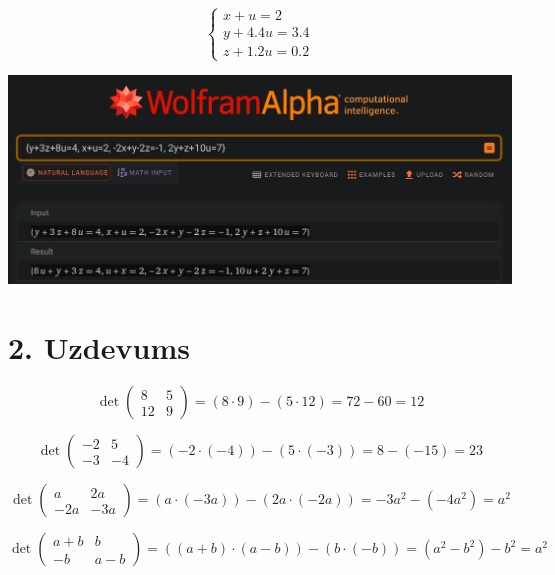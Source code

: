 \documentclass{article}
\begin{document}
\begin{equation*}
    \begin{cases}
        x + u = 2\\
        y + 4.4u = 3.4\\
        z + 1.2u = 0.2
    \end{cases}
\end{equation*}

\includegraphics[width=\textwidth]{1}

\section*{2. Uzdevums}
\begin{equation*}
\det
\begin{pmatrix}
    8 & 5\\
    12 & 9
\end{pmatrix} 
 =
(8 \cdot 9) - (5 \cdot 12)
= 
72 - 60
=
12
\end{equation*}

\begin{equation*}
    \det
    \begin{pmatrix}
        -2 & 5\\
        -3 & -4
    \end{pmatrix} 
     =
    (-2 \cdot (-4)) - (5 \cdot (-3))
    = 
    8 - (-15)
    =
    23
\end{equation*}

\begin{equation*}
    \det
    \begin{pmatrix}
        a & 2a\\
        -2a & -3a
    \end{pmatrix} 
    = 
    (a \cdot (-3a)) - (2a \cdot (-2a))
    = 
    -3a^2 - (-4a^2)
    =
    a^2
\end{equation*}

\begin{equation*}
    \det
    \begin{pmatrix}
        a + b & b\\
        -b & a - b
    \end{pmatrix} 
    = 
    ((a + b) \cdot (a - b)) - (b \cdot (-b))
    = 
    (a^2 - b^2) - b^2
    =
    a^2
\end{equation*}
\end{document}
